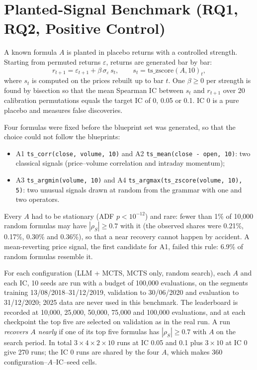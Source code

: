 \documentclass[12pt,a4paper,oneside]{book}
\theoremstyle{definition}
\newcommand{\code}[1]{\texttt{#1}}
\begin{document}
\section{Planted-Signal Benchmark (RQ1, RQ2, Positive Control)}
\label{sec:planted}

A known formula $A$ is planted in placebo returns with a controlled strength. Starting from permuted returns $\varepsilon$, returns are generated bar by bar:
\begin{equation}
r_{t+1} = \varepsilon_{t+1} + \beta\, \sigma_\varepsilon\, s_t, \qquad s_t = \mathrm{ts\_zscore}(A, 10)_t,
\end{equation}
where $s_t$ is computed on the prices rebuilt up to bar $t$. One $\beta \ge 0$ per strength is found by bisection so that the mean Spearman IC between $s_t$ and $r_{t+1}$ over 20 calibration permutations equals the target IC of 0, 0.05 or 0.1. IC 0 is a pure placebo and measures false discoveries.

Four formulas were fixed before the blueprint set was generated, so that the choice could not follow the blueprints:
\begin{itemize}
  \item A1 \code{ts\_corr(close, volume, 10)} and A2 \code{ts\_mean(close - open, 10)}: two classical signals (price--volume correlation and intraday momentum);
  \item A3 \code{ts\_argmin(volume, 10)} and A4 \code{ts\_argmax(ts\_zscore(volume, 10), 5)}: two unusual signals drawn at random from the grammar with one and two operators.
\end{itemize}
Every $A$ had to be stationary (ADF $p < 10^{-12}$) and rare: fewer than 1\% of 10,000 random formulas may have $|\rho_S| \ge 0.7$ with it (the observed shares were 0.21\%, 0.17\%, 0.30\% and 0.36\%), so that a near recovery cannot happen by accident. A mean-reverting price signal, the first candidate for A1, failed this rule: 6.9\% of random formulas resemble it.

For each configuration (LLM + MCTS, MCTS only, random search), each $A$ and each IC, 10 seeds are run with a budget of 100,000 evaluations, on the segments training 13/08/2018--31/12/2019, validation to 30/06/2020 and evaluation to 31/12/2020; 2025 data are never used in this benchmark. The leaderboard is recorded at 10,000, 25,000, 50,000, 75,000 and 100,000 evaluations, and at each checkpoint the top five are selected on validation as in the real run. A run \emph{recovers $A$ nearly} if one of its top five formulas has $|\rho_S| \ge 0.7$ with $A$ on the search period. In total $3 \times 4 \times 2 \times 10$ runs at IC 0.05 and 0.1 plus $3 \times 10$ at IC 0 give 270 runs; the IC 0 runs are shared by the four $A$, which makes 360 configuration--$A$--IC--seed cells.
\end{document}

